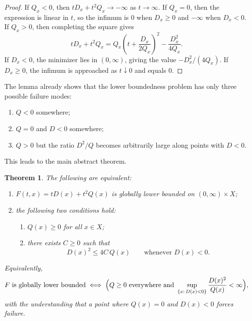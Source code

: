 \documentclass[11pt,a4paper]{article}
\newtheorem{theorem}{Theorem}[section]
\theoremstyle{definition}
\theoremstyle{remark}
\begin{document}
\begin{proof}
If $Q_x<0$, then $tD_x+t^2Q_x\to -\infty$ as $t\to\infty$. If $Q_x=0$, then the expression is linear in $t$, so the infimum is $0$ when $D_x\ge 0$ and $-\infty$ when $D_x<0$. If $Q_x>0$, then completing the square gives
\[
tD_x+t^2Q_x
=
Q_x\left(t+\frac{D_x}{2Q_x}\right)^2-\frac{D_x^2}{4Q_x}.
\]
If $D_x<0$, the minimizer lies in $(0,\infty)$, giving the value $-D_x^2/(4Q_x)$. If $D_x\ge 0$, the infimum is approached as $t\downarrow0$ and equals $0$.
\end{proof}

The lemma already shows that the lower boundedness problem has only three possible failure modes:
\begin{enumerate}[label=(\roman*)]
  \item $Q<0$ somewhere;
  \item $Q=0$ and $D<0$ somewhere;
  \item $Q>0$ but the ratio $D^2/Q$ becomes arbitrarily large along points with $D<0$.
\end{enumerate}
This leads to the main abstract theorem.

\begin{theorem}\label{thm:abstract-criterion}
The following are equivalent:
\begin{enumerate}[label=(\arabic*)]
  \item $F(t,x)=tD(x)+t^2Q(x)$ is globally lower bounded on $(0,\infty)\times X$;
  \item the following two conditions hold:
  \begin{enumerate}[label=(\alph*)]
    \item $Q(x)\ge 0$ for all $x\in X$;
    \item there exists $C\ge 0$ such that
    \[
    D(x)^2\le 4C\,Q(x)
    \qquad\text{whenever }D(x)<0.
    \]
  \end{enumerate}
\end{enumerate}
Equivalently,
\[
F\text{ is globally lower bounded}
\iff
\Bigl(Q\ge0\ \text{everywhere and }\sup_{\{x:\,D(x)<0\}}\frac{D(x)^2}{Q(x)}<\infty\Bigr),
\]
with the understanding that a point where $Q(x)=0$ and $D(x)<0$ forces failure.
\end{theorem}
\end{document}
